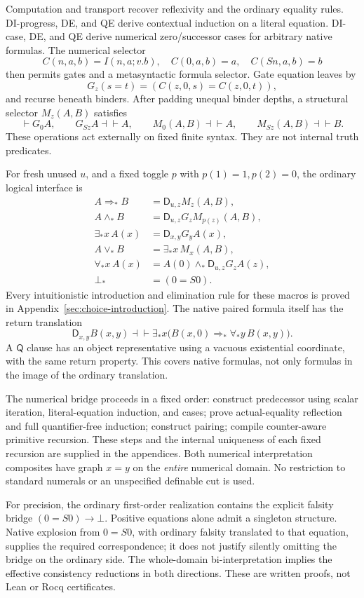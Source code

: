 \documentclass[11pt,letterpaper]{article}
\theoremstyle{definition}\newtheorem{definition}[theorem]{Definition}
\theoremstyle{remark}\newtheorem{remark}[theorem]{Remark}
\newcommand{\D}{\mathsf D}
\newcommand{\Q}{\mathsf Q}
\begin{document}
Computation and transport recover reflexivity and the ordinary equality
rules. DI-progress, DE, and QE derive contextual induction on a literal
equation. DI-case, DE, and QE derive numerical zero/successor cases for
arbitrary native formulas. The numerical selector
\[
 C(n,a,b)=I(n,a;v.b),\quad C(0,a,b)=a,\quad C(Sn,a,b)=b
\]
then permits gates and a metasyntactic formula selector. Gate equation
leaves by
\[
 G_z(s=t)=(C(z,0,s)=C(z,0,t)),
\]
and recurse beneath binders. After padding unequal binder depths, a
structural selector $M_z(A,B)$ satisfies
\[
 \vdash G_0A,\qquad G_{Sz}A\dashv\vdash A,\qquad
 M_0(A,B)\dashv\vdash A,\qquad M_{Sz}(A,B)\dashv\vdash B.
\]
These operations act externally on fixed finite syntax. They are not
internal truth predicates.

For fresh unused $u$, and a fixed toggle $p$ with $p(1)=1,p(2)=0$,
the ordinary logical interface is
\begin{align*}
 A\Rightarrow_*B&=\D_{u,z}M_z(A,B),\\
 A\wedge_*B&=\D_{u,z}G_zM_{p(z)}(A,B),\\
 \exists_*x\,A(x)&=\D_{x,y}G_yA(x),\\
 A\vee_*B&=\exists_*x\,M_x(A,B),\\
 \forall_*x\,A(x)&=A(0)\wedge_*\D_{u,z}G_zA(z),\\
 \bot_*&=(0=S0).
\end{align*}
Every intuitionistic introduction and elimination rule for these macros
is proved in Appendix~\ref{sec:choice-introduction}. The native paired
formula itself has the return translation
\[
 \D_{x,y}B(x,y)\dashv\vdash
 \exists_*x\bigl(B(x,0)\Rightarrow_*\forall_*y\,B(x,y)\bigr).
\]
A $\Q$ clause has an object representative using a vacuous existential
coordinate, with the same return property. This covers native formulas,
not only formulas in the image of the ordinary translation.

The numerical bridge proceeds in a fixed order: construct predecessor
using scalar iteration, literal-equation induction, and cases; prove
actual-equality reflection and full quantifier-free induction; construct
pairing; compile counter-aware primitive recursion. These steps and the
internal uniqueness of each fixed recursion are supplied in the
appendices. Both numerical interpretation composites have graph $x=y$
on the \emph{entire} numerical domain. No restriction to standard
numerals or an unspecified definable cut is used.

For precision, the ordinary first-order realization contains the
explicit falsity bridge $(0=S0)\to\bot$. Positive equations alone admit
a singleton structure. Native explosion from $0=S0$, with ordinary
falsity translated to that equation, supplies the required correspondence;
it does not justify silently omitting the bridge on the ordinary side.
The whole-domain bi-interpretation implies the effective consistency
reductions in both directions. These are written proofs, not Lean or
Rocq certificates.
\end{document}
